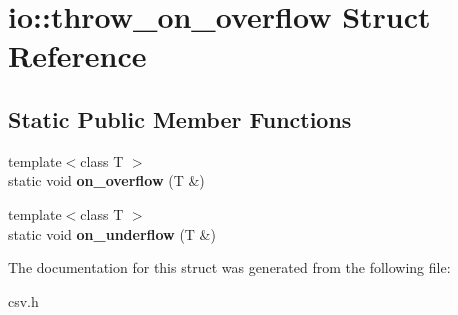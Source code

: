 \section{io\+:\+:throw\+\_\+on\+\_\+overflow Struct Reference}
\label{structio_1_1throw__on__overflow}
\subsection*{Static Public Member Functions}
\begin{DoxyCompactItemize}
\item 
{\footnotesize template$<$class T $>$ }\\static void {\bfseries on\+\_\+overflow} (T \&)\label{structio_1_1throw__on__overflow_a0a59c1dc2ead1a9275c62885ec7545d2}

\item 
{\footnotesize template$<$class T $>$ }\\static void {\bfseries on\+\_\+underflow} (T \&)\label{structio_1_1throw__on__overflow_a2ae91b1ae3d655c16f7e6a7e9a1abd92}

\end{DoxyCompactItemize}


The documentation for this struct was generated from the following file\+:\begin{DoxyCompactItemize}
\item 
csv.\+h\end{DoxyCompactItemize}
